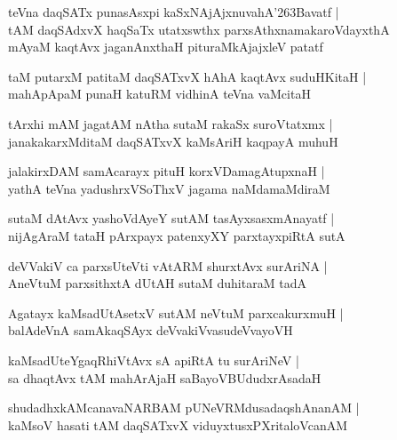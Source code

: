 \begin{shloka}
teVna daqSATx punasAsxpi kaSxNAjAjxnuvahA\char'263Bavatf |\\
tAM daqSAdxvX haqSaTx utatxswthx parxsAthxnamakaroVdayxthA\\
mAyaM kaqtAvx jaganAnxthaH pituraMkAjajxleV patatf
\end{shloka}

\begin{shloka}
taM putarxM patitaM daqSATxvX hAhA kaqtAvx suduHKitaH |\\
mahApApaM punaH katuRM vidhinA teVna vaMcitaH
\end{shloka}

\begin{shloka}
tArxhi mAM jagatAM nAtha sutaM rakaSx suroVtatxmx |\\
janakakarxMditaM daqSATxvX kaMsAriH kaqpayA muhuH
\end{shloka}

\begin{shloka}
jalakirxDAM samAcarayx pituH korxVDamagAtupxnaH |\\
yathA teVna yadushrxVSoThxV jagama naMdamaMdiraM
\end{shloka}

\begin{shloka}
sutaM dAtAvx yashoVdAyeY sutAM tasAyxsasxmAnayatf |\\
nijAgAraM tataH pArxpayx patenxyXY parxtayxpiRtA sutA
\end{shloka}

\begin{shloka}
deVVakiV ca parxsUteVti vAtARM shurxtAvx surAriNA |\\
AneVtuM parxsithxtA dUtAH sutaM duhitaraM tadA
\end{shloka}

\begin{shloka}
Agatayx kaMsadUtAsetxV sutAM neVtuM parxcakurxmuH |\\
balAdeVnA samAkaqSAyx deVvakiVvasudeVvayoVH
\end{shloka}

\begin{shloka}
kaMsadUteYgaqRhiVtAvx sA apiRtA tu surAriNeV |\\
sa dhaqtAvx tAM mahArAjaH saBayoVBUdudxrAsadaH
\end{shloka}

\begin{shloka}
shudadhxkAMcanavaNARBAM pUNeVRMdusadaqshAnanAM |\\
kaMsoV hasati tAM daqSATxvX viduyxtusxPXritaloVcanAM 
\end{shloka}

